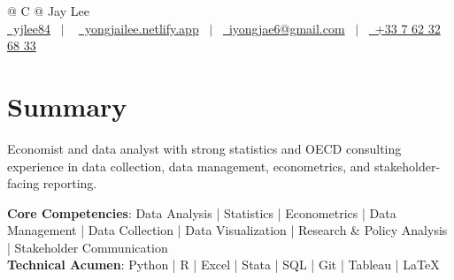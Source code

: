 \documentclass[a4paper,12pt]{article}
\begin{document}
\pagestyle{empty} 



\begin{tabularx}{\linewidth}{@{} C @{}}
\Huge{Jay Lee} \\[7.5pt]
\href{https://github.com/yjlee84}{\raisebox{-0.05\height}\faGithub\ yjlee84} \ $|$ \ 
\href{https://yongjailee.netlify.app}{\raisebox{-0.05\height}\faGlobe \ yongjailee.netlify.app} \ $|$ \ 
\href{mailto:email@mysite.com}{\raisebox{-0.05\height}\faEnvelope \ iyongjae6@gmail.com} \ $|$ \ 
\href{tel:+000000000000}{\raisebox{-0.05\height}\faMobile \ +33 7 62 32 68 33} \\
\end{tabularx}


\section{Summary}
Economist and data analyst with strong statistics and OECD consulting experience in data collection, data management, econometrics, and stakeholder-facing reporting.

\textbf{Core Competencies}: Data Analysis | Statistics | Econometrics | Data Management | Data Collection | Data Visualization | Research \& Policy Analysis | Stakeholder Communication\\
\textbf{Technical Acumen}: Python | R | Excel | Stata | SQL | Git | Tableau | \LaTeX{}
\end{document}
